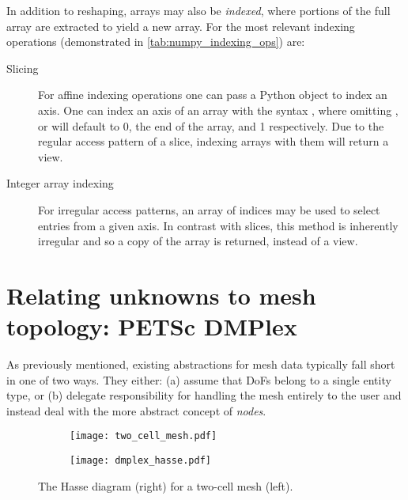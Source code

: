 \documentclass[thesis]{subfiles}
\begin{document}
In addition to reshaping, arrays may also be \textit{indexed}, where portions of the full array are extracted to yield a new array.
For  the most relevant indexing operations (demonstrated in \cref{tab:numpy_indexing_ops}) are:

\begin{description}
  \item[Slicing]
    For affine indexing operations one can pass a Python  object to index an axis.
    One can index an axis of an array with the syntax , where omitting ,  or  will default to 0, the end of the array, and 1 respectively.
    Due to the regular access pattern of a slice, indexing \numpy arrays with them will return a view.

  \item[Integer array indexing]
    For irregular access patterns, an array of indices may be used to select entries from a given axis.
    In contrast with slices, this method is inherently irregular and so a copy of the array is returned, instead of a view.
\end{description}

\section{Relating unknowns to mesh topology: PETSc DMPlex}
\label{sec:foundations_dmplex}


As previously mentioned, existing abstractions for mesh data typically fall short in one of two ways.
They either:
(a) assume that DoFs belong to a single entity type, or
(b) delegate responsibility for handling the mesh entirely to the user and instead deal with the more abstract concept of \emph{nodes}.

\begin{figure}
  \centering
  \begin{subfigure}{.49\textwidth}
    \centering
    \texttt{[image: two\_cell\_mesh.pdf]}
  \end{subfigure}
  \begin{subfigure}{.49\textwidth}
    \centering
    \texttt{[image: dmplex\_hasse.pdf]}
  \end{subfigure}
  \caption{
    The Hasse diagram (right) for a two-cell mesh (left).
  }
  \label{fig:dmplex_hasse}
\end{figure}
\end{document}
